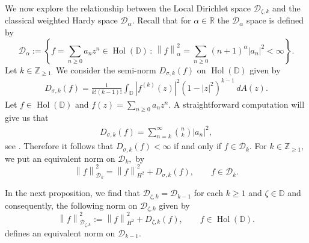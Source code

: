 \documentclass[10pt,oneside,reqno]{amsart}
\theoremstyle{definition}
\theoremstyle{remark}
\newcommand{\norm}[1]{\left\lVert #1 \right\rVert}
\newcommand{\abs}[1]{\left\lvert #1 \right\rvert}
\renewcommand{\ge}{\geqslant}
\newcommand{\D}{\mathbb D}
\numberwithin{equation}{section}
\begin{document}
We now explore the relationship between the Local Dirichlet space $\mathscr D_{\zeta,k }$ and the classical weighted Hardy space $\mathscr{D} _{\alpha}.$
Recall that for $\alpha \in  \mathbb R$ the $\mathscr{D} _{\alpha}$ space is defined by
\begin{equation*}
    \mathscr{D}_{\alpha} :=  \left\{ f = \sum_{n \ge 0} a_{n} z^{n} \in \operatorname{Hol} \left( \D \right)\, : \, \norm{f}_{\alpha}^{2} = \sum_{n \ge 0} \left( n+1 \right)^{\alpha} \abs{a_{n}}^{2} < \infty  \right\}.
    \end{equation*}
Let $k\in \mathbb Z_{\geqslant 1.}$ We consider the semi-norm $D_{\sigma,k}(f)$ on $\operatorname{Hol}(\D)$ given by 
\begin{align*}
    D_{\sigma,k}(f)= \frac{1}{k! (k-1)!}\int_{\D} |f^{(k)}(z)|^2 (1-|z|^2)^{k-1}\, dA(z).
\end{align*}
Let $f\in \operatorname{Hol}(\D)$ and $f(z)= \sum_{n\geqslant 0} a_n z^n.$ A straightforward computation will give us that 
\begin{align*}
    D_{\sigma,k}(f)= \sum\limits_{n=k}^{\infty} \binom{n}{k}|a_n|^2,
\end{align*} 
see \cite[Lemma 3.2]{Rydhe19}. Therefore it follows that $D_{\sigma,k}(f) < \infty$ if and only if $f\in \mathscr D_k.$  For $k \in \mathbb Z_{\geqslant 1},$  we put an equivalent norm on $\mathscr D _{k},$  by
\begin{equation*}
    \norm{f}_{\mathscr D _{k}} ^{2} = \norm{f}_{H^{2}}^{2} + D_{\sigma, k} \left( f \right), \qquad f \in \mathscr D_{k}.
\end{equation*}

In the next proposition, we find that $\mathscr D_{\zeta,k } =\mathscr D_{k-1}$ for each $k \ge 1$ and $\zeta \in \mathbb D$ and consequently, the following norm on $\mathscr D_{\zeta, k}$ given by
\begin{equation*}
    \norm{f}_{\mathscr D{_{\zeta, k}}} ^{2}  := \norm{f}_{H^{2}}^{2} +D_{\zeta,k} \left( f \right), \qquad f\in \operatorname{Hol} \left( \D \right) .
\end{equation*}
defines an equivalent norm on $\mathscr D_{k-1}$.
\end{document}
